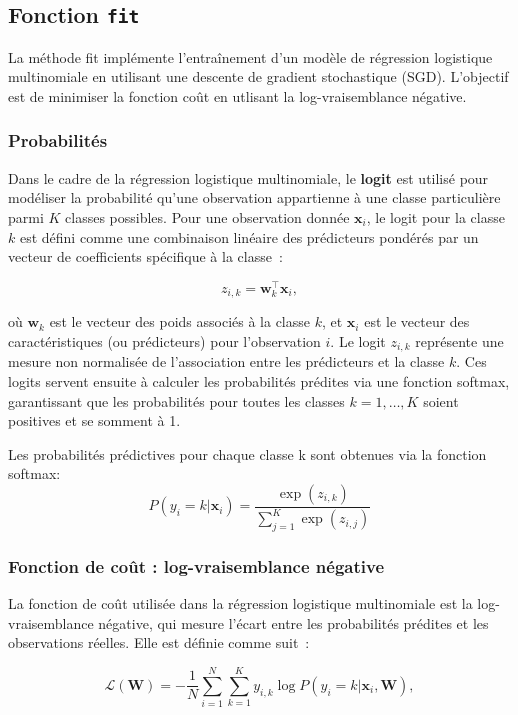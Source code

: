 \documentclass{rapport}
\begin{document}
\subsection{Fonction \texttt{fit}}
La méthode fit implémente l'entraînement d'un modèle de régression logistique multinomiale en utilisant une descente de gradient stochastique (SGD). L'objectif est de minimiser la fonction coût en utlisant la log-vraisemblance négative.

\subsubsection{Probabilités}
Dans le cadre de la régression logistique multinomiale, le \textbf{logit} est utilisé pour modéliser la probabilité qu'une observation appartienne à une classe particulière parmi $K$ classes possibles. Pour une observation donnée $\mathbf{x}_i$, le logit pour la classe $k$ est défini comme une combinaison linéaire des prédicteurs pondérés par un vecteur de coefficients spécifique à la classe :

\[
z_{i,k} = \mathbf{w}_k^\top \mathbf{x}_i,
\]

où $\mathbf{w}_k$ est le vecteur des poids associés à la classe $k$, et $\mathbf{x}_i$ est le vecteur des caractéristiques (ou prédicteurs) pour l’observation $i$. Le logit $z_{i,k}$ représente une mesure non normalisée de l’association entre les prédicteurs et la classe $k$. Ces logits servent ensuite à calculer les probabilités prédites via une fonction softmax, garantissant que les probabilités pour toutes les classes $k = 1, \ldots, K$ soient positives et se somment à 1.


 
Les probabilités prédictives pour chaque classe k sont obtenues via la fonction softmax:
\[
P(y_i = k | \mathbf{x}_i) = \frac{\exp(z_{i,k})}{\sum_{j=1}^K \exp(z_{i,j})}
\]

\subsubsection{Fonction de coût : log-vraisemblance négative}

La fonction de coût utilisée dans la régression logistique multinomiale est la log-vraisemblance négative, qui mesure l'écart entre les probabilités prédites et les observations réelles. Elle est définie comme suit :

\[
\mathcal{L}(\mathbf{W}) = - \frac{1}{N} \sum_{i=1}^N \sum_{k=1}^K y_{i,k} \log P(y_i = k | \mathbf{x}_i, \mathbf{W}),
\]
\end{document}
